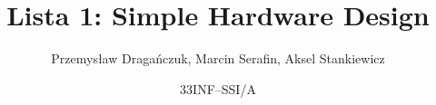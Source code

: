 


\title{Lista 1: Simple Hardware Design}
\author{Przemysław Dragańczuk, Marcin Serafin, Aksel Stankiewicz}
\date{33INF--SSI/A}



\maketitle
\newpage








